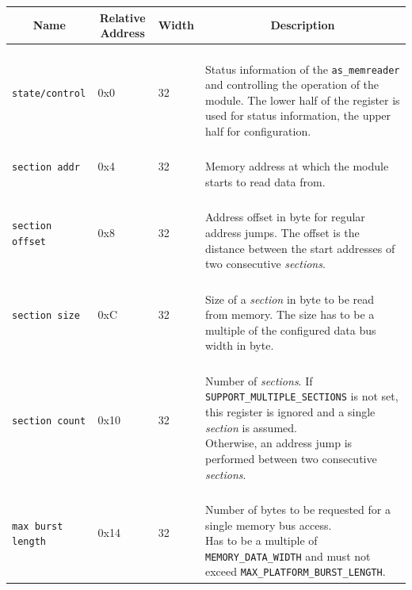 \begin{longtable}[ht]{|l|l|l|l|}
    \hline
    \multicolumn{1}{|c|}{\textbf{Name}} & \multicolumn{1}{c|}{\textbf{Relative Address}} & \multicolumn{1}{c|}{\textbf{Width}} & \multicolumn{1}{c|}{\textbf{Description}}\\
    \hline
    
    \texttt{state/control} & 0x0 & 32 & \parbox{7cm}{\ \\
        Status information of the \texttt{as\_memreader} and controlling the operation of the module. The lower half of the register is used for status information, the upper half for configuration.\vspace{0.3em}
    }\\
    \hline
    
    \texttt{section addr} & 0x4 & 32 & \parbox{7cm}{\ \\
        Memory address at which the module starts to read data from.\vspace{0.3em}
    }\\
    \hline
    
    \texttt{section offset} & 0x8 & 32 & \parbox{7cm}{\ \\
        Address offset in byte for regular address jumps. The offset is the distance between the start addresses of two consecutive \textit{sections}.\vspace{0.3em}
    }\\
    \hline
    
    \texttt{section size} & 0xC & 32 & \parbox{7cm}{\ \\
        Size of a \textit{section} in byte to be read from memory. The size has to be a multiple of the configured data bus width in byte.\vspace{0.3em}
    }\\
    \hline
    
    \texttt{section count} & 0x10 & 32 & \parbox{7cm}{\ \\
        Number of \textit{sections}. If \texttt{SUPPORT\_MULTIPLE\_SECTIONS} is not set, this register is ignored and a single \textit{section} is assumed.\\
        Otherwise, an address jump is performed between two consecutive \textit{sections}.\vspace{0.3em}
    }\\
    \hline
    
    \texttt{max burst length} & 0x14 & 32 & \parbox{7cm}{\ \\
        Number of bytes to be requested for a single memory bus access.\\
        Has to be a multiple of \texttt{MEMORY\_DATA\_WIDTH} and must not exceed \texttt{MAX\_PLATFORM\_BURST\_LENGTH}.\vspace{0.3em}
    }\\
    \hline
    

\end{longtable}
